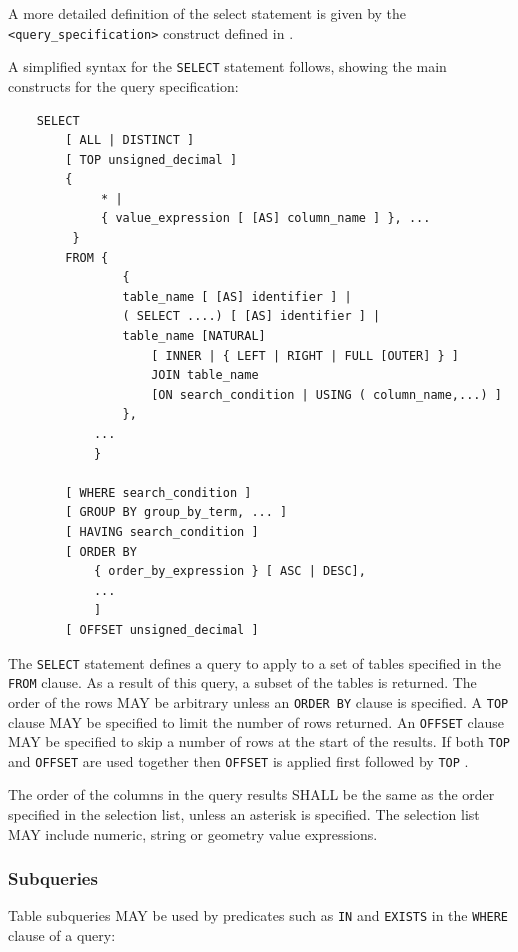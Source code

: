 \documentclass[11pt,a4paper]{ivoa}
\begin{document}
A more detailed definition of the select statement is given by the \verb:<query_specification>:
construct defined in .

A simplified syntax for the \verb:SELECT: statement follows, showing the main constructs for
the query specification:

\begin{verbatim}
    SELECT
        [ ALL | DISTINCT ]
        [ TOP unsigned_decimal ]
        {
             * |
             { value_expression [ [AS] column_name ] }, ...
         }
        FROM {
                {
                table_name [ [AS] identifier ] |
                ( SELECT ....) [ [AS] identifier ] |
                table_name [NATURAL]
                    [ INNER | { LEFT | RIGHT | FULL [OUTER] } ]
                    JOIN table_name
                    [ON search_condition | USING ( column_name,...) ]
                },
            ...
            }

        [ WHERE search_condition ]
        [ GROUP BY group_by_term, ... ]
        [ HAVING search_condition ]
        [ ORDER BY
            { order_by_expression } [ ASC | DESC],
            ...
            ]
        [ OFFSET unsigned_decimal ]
\end{verbatim}

The \verb:SELECT: statement defines a query to apply to a set of tables specified
in the \verb:FROM: clause. As a result of this query, a subset of the tables
is returned.
The order of the rows MAY be arbitrary unless an \verb:ORDER BY: clause is specified.
A \verb:TOP: clause MAY be specified to limit the number of rows returned. 
An \verb:OFFSET: clause MAY be specified to skip a number of rows at the start
of the results.
If both \verb:TOP: and \verb:OFFSET: are used together then \verb:OFFSET: is applied
first followed by \verb:TOP: . 

The order of the columns in the query results SHALL be the same as the
order specified in the selection list,
unless an asterisk is specified.
The selection list MAY include numeric,
string or geometry value expressions.

\subsubsection{Subqueries}
\label{sec:subqueries}

Table subqueries MAY be used by predicates such as \verb:IN: and \verb:EXISTS:
in the \verb:WHERE: clause of a query:
\end{document}
